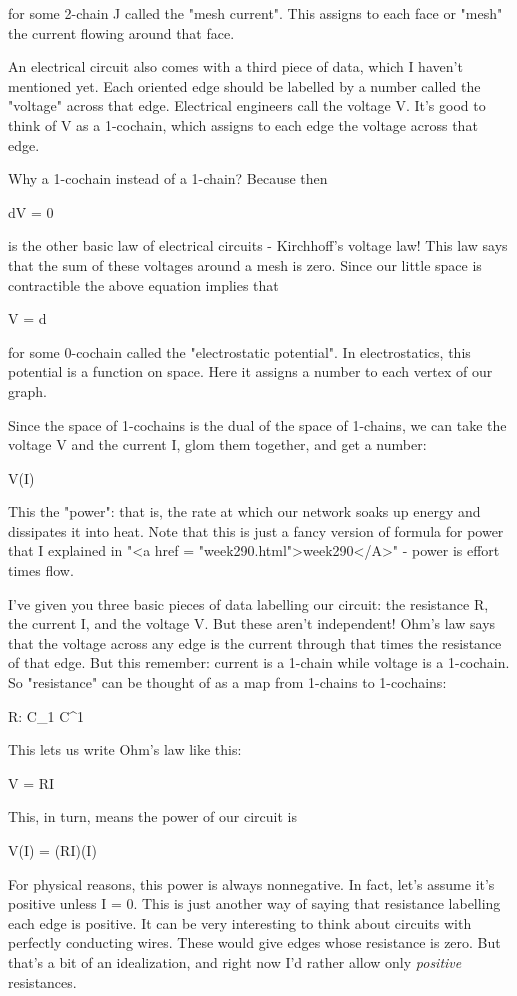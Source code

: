 for some 2-chain J called the "mesh current".  This assigns to each
face or "mesh" the current flowing around that face.

An electrical circuit also comes with a third piece of data, which I
haven't mentioned yet.  Each oriented edge should be labelled by a
number called the "voltage" across that edge.  Electrical engineers
call the voltage V.  It's good to think of V as a 1-cochain, which
assigns to each edge the voltage across that edge.  

Why a 1-cochain instead of a 1-chain?  Because then

dV = 0

is the other basic law of electrical circuits - Kirchhoff's voltage
law!  This law says that the sum of these voltages around a mesh is
zero.  Since our little space is contractible the above equation
implies that

V = d\phi 

for some 0-cochain \phi  called the "electrostatic potential".  In 
electrostatics, this potential is a function on space.  Here it
assigns a number to each vertex of our graph.  

Since the space of 1-cochains is the dual of the space of 1-chains, we
can take the voltage V and the current I, glom them together, and get
a number:

V(I)

This the "power": that is, the rate at which our network
soaks up energy and dissipates it into heat.  Note that this is just a
fancy version of formula for power that I explained in "<a href =
"week290.html">week290</A>" - power is effort times flow.

I've given you three basic pieces of data labelling our circuit: the
resistance R, the current I, and the voltage V.  But these aren't
independent!  Ohm's law says that the voltage across any edge is the
current through that times the resistance of that edge.  But this
remember: current is a 1-chain while voltage is a 1-cochain.  So
"resistance" can be thought of as a map from 1-chains to
1-cochains:

R: C_{1} \to  C^{1}

This lets us write Ohm's law like this:

V = RI

This, in turn, means the power of our circuit is

V(I) = (RI)(I)

For physical reasons, this power is always nonnegative.  In fact,
let's assume it's positive unless I = 0.  This is just another way of
saying that resistance labelling each edge is positive.  It can be
very interesting to think about circuits with perfectly conducting
wires.  These would give edges whose resistance is zero.  But that's a
bit of an idealization, and right now I'd rather allow only \emph{positive}
resistances.

